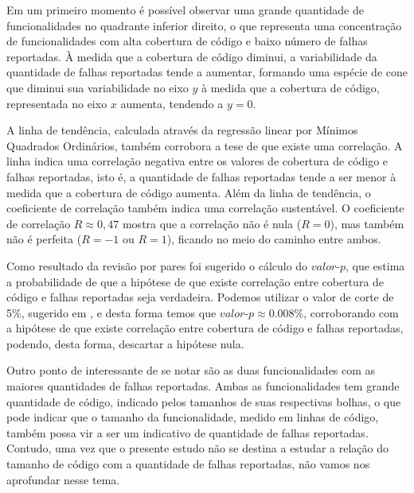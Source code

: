 \documentclass[11.5pt]{article}
\begin{document}
Em um primeiro momento é possível observar uma grande quantidade de funcionalidades no quadrante
inferior direito, o que representa uma concentração de funcionalidades com alta cobertura de código
e baixo número de falhas reportadas.
À medida que a cobertura de código diminui, a variabilidade da quantidade de falhas reportadas tende
a aumentar, formando uma espécie de cone que diminui sua variabilidade no eixo $y$ à medida que
a cobertura de código, representada no eixo $x$ aumenta, tendendo a $y = 0$.

A linha de tendência, calculada através da regressão linear por Mínimos Quadrados Ordinários,
também corrobora a tese de que existe uma correlação.
A linha indica uma correlação negativa entre os valores de cobertura de código e falhas reportadas,
isto é, a quantidade de falhas reportadas tende a ser menor à medida que a cobertura de código
aumenta.
Além da linha de tendência, o coeficiente de correlação também indica uma correlação sustentável.
O coeficiente de correlação $R \approx 0,47$ mostra que a correlação não é nula ($R = 0$), mas
também não é perfeita ($R = -1$ ou $R = 1$), ficando no meio do caminho entre ambos.

Como resultado da revisão por pares foi sugerido o cálculo do $valor\mbox{-}p$, que estima a
probabilidade de que a hipótese de que existe correlação entre cobertura de código e falhas
reportadas seja verdadeira.
Podemos utilizar o valor de corte de 5\%, sugerido em \cite{openIntroStat}, e desta forma temos
que $valor\mbox{-}p \approx 0.008\%$, corroborando com a hipótese de que existe correlação entre cobertura
de código e falhas reportadas, podendo, desta forma, descartar a hipótese nula.

Outro ponto de interessante de se notar são as duas funcionalidades com as maiores quantidades de
falhas reportadas.
Ambas as funcionalidades tem grande quantidade de código, indicado pelos tamanhos de suas
respectivas bolhas, o que pode indicar que o tamanho da funcionalidade, medido em linhas de código,
também possa vir a ser um indicativo de quantidade de falhas reportadas.
Contudo, uma vez que o presente estudo não se destina a estudar a relação do tamanho de código com
a quantidade de falhas reportadas, não vamos nos aprofundar nesse tema.
\end{document}
